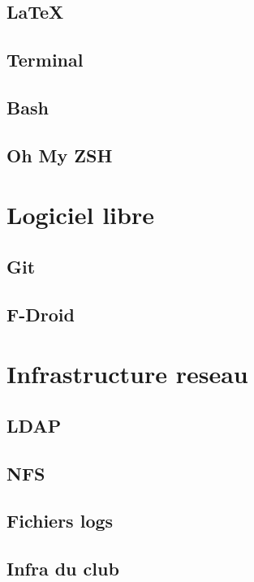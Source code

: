 \documentclass[a4paper]{report}
\begin{document}
  \section{LaTeX}
    
    
  \section{Terminal}
    
  \section{Bash}
    
  \section{Oh My ZSH}
    
    
\chapter{Logiciel libre}
  \section{Git}
    
  \section{F-Droid}
    
    
\chapter{Infrastructure reseau}
  \section{LDAP}
    
  \section{NFS}
    
  \section{Fichiers logs}
    
  \section{Infra du club}
    
\end{document}
